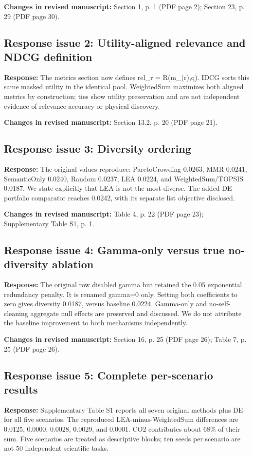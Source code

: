 \documentclass[11pt,a4paper]{article}
\begin{document}
\textbf{Changes in revised manuscript:} Section 1, p. 1 (PDF page 2); Section 23, p. 29 (PDF page 30).

\subsection*{Response issue 2: Utility-aligned relevance and NDCG definition}
\textbf{Response:} The metrics section now defines rel\_r = R(m\_(r),q). IDCG sorts this same masked utility in the identical pool. WeightedSum maximizes both aligned metrics by construction; ties show utility preservation and are not independent evidence of relevance accuracy or physical discovery.

\textbf{Changes in revised manuscript:} Section 13.2, p. 20 (PDF page 21).

\subsection*{Response issue 3: Diversity ordering}
\textbf{Response:} The original values reproduce: ParetoCrowding 0.0263, MMR 0.0241, SemanticOnly 0.0240, Random 0.0237, LEA 0.0224, and WeightedSum/TOPSIS 0.0187. We state explicitly that LEA is not the most diverse. The added DE portfolio comparator reaches 0.0242, with its separate list objective disclosed.

\textbf{Changes in revised manuscript:} Table 4, p. 22 (PDF page 23); Supplementary Table S1, p. 1.

\subsection*{Response issue 4: Gamma-only versus true no-diversity ablation}
\textbf{Response:} The original row disabled gamma but retained the 0.05 exponential redundancy penalty. It is renamed gamma=0 only. Setting both coefficients to zero gives diversity 0.0187, versus baseline 0.0224. Gamma-only and no-self-cleaning aggregate null effects are preserved and discussed. We do not attribute the baseline improvement to both mechanisms independently.

\textbf{Changes in revised manuscript:} Section 16, p. 25 (PDF page 26); Table 7, p. 25 (PDF page 26).

\subsection*{Response issue 5: Complete per-scenario results}
\textbf{Response:} Supplementary Table S1 reports all seven original methods plus DE for all five scenarios. The reproduced LEA-minus-WeightedSum differences are 0.0125, 0.0000, 0.0028, 0.0029, and 0.0001. CO2 contributes about 68\% of their sum. Five scenarios are treated as descriptive blocks; ten seeds per scenario are not 50 independent scientific tasks.
\end{document}
